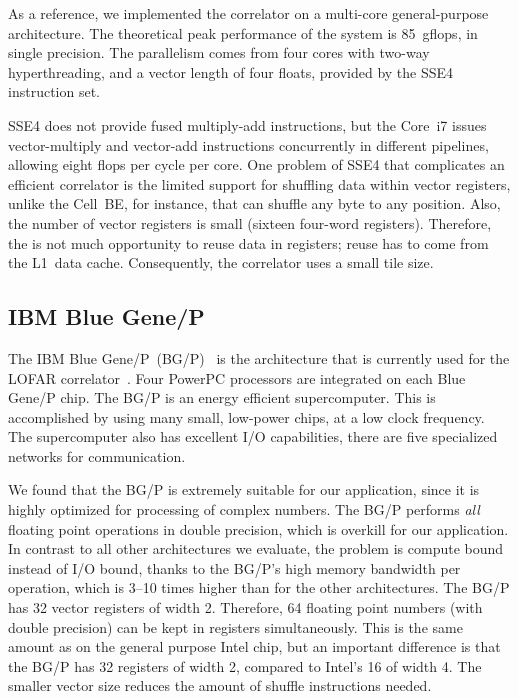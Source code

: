 \documentclass{article}
\begin{document}
As a reference, we implemented the correlator on a multi-core general-purpose
architecture.
The theoretical peak performance of the system is 85~gflops, in single
precision.
The parallelism comes from four cores with two-way hyperthreading, and a vector length of four floats,
provided by the SSE4 instruction set.  

SSE4 does not provide fused multiply-add instructions, but the Core~i7 issues
vector-multiply and vector-add instructions concurrently in different pipelines,
allowing eight flops per cycle per core.
One problem of SSE4 that complicates an efficient correlator is the limited
support for shuffling data within vector registers, unlike the Cell~BE, for
instance, that can shuffle any byte to any position.
Also, the number of vector registers is small (sixteen four-word registers).
Therefore, the is not much opportunity to reuse data in registers; reuse
has to come from the L1~data cache.
Consequently, the correlator uses a small tile size.


\subsection{IBM Blue Gene/P}

The IBM Blue Gene/P~(BG/P)~\cite{IBM:08} is the architecture that is
currently used for the LOFAR correlator~\cite{Romein:06,Romein:09b}.
Four PowerPC processors are integrated on each Blue Gene/P chip.
The BG/P is an energy efficient supercomputer.
This is accomplished by using many small, low-power chips, at a low clock
frequency.
The supercomputer also has excellent I/O capabilities, there are five
specialized networks for communication.

We found that the BG/P is extremely suitable for our application,
since it is highly optimized for processing of complex numbers.
The BG/P performs \emph{all} floating point operations in double
precision, which is overkill for our application.
In contrast to all other architectures we evaluate, the problem is compute
bound instead of I/O bound, thanks to the BG/P's high memory bandwidth per
operation, which is 3--10 times higher than for the other architectures.
The BG/P has 32 vector registers of width 2.  Therefore, 64 floating
point numbers (with double precision) can be kept in registers
simultaneously. This is the same amount as on the general purpose
Intel chip, but an important difference is that the BG/P has 32
registers of width 2, compared to Intel's 16 of width 4.  The smaller
vector size reduces the amount of shuffle instructions needed.
\end{document}
